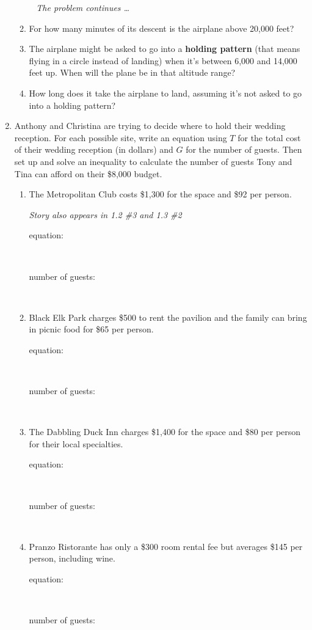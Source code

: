 \begin{enumerate}
\begin{enumerate}
\newpage %
~\hspace{-.5in} \emph{The problem continues \ldots}

\item For how many minutes of its descent is the airplane above 20,000 feet? \vfill
\item The airplane might be asked to go into a \textbf{holding pattern} (that means flying in a circle instead of landing) when it's between 6,000 and 14,000 feet up.  When will the plane be in that altitude range? \vfill
\item How long does it take the airplane to land, assuming it's not asked to go into a holding pattern? \vfill
\end{enumerate}

\newpage %

\item Anthony and Christina are trying to decide where to hold their wedding reception.  For each possible site, write an equation using $T$ for the total cost of their wedding reception (in dollars) and $G$ for the number of guests.  Then set up and solve an inequality to calculate the number of guests Tony and Tina can afford on their \$8,000 budget.  
\begin{enumerate}
\item The Metropolitan Club costs \$1,300 for the space and \$92 per person.
 
\hfill \emph{Story also appears in 1.2 \#3 and 1.3 \#2} \bigskip
\begin{description}
\item [equation:] ~\bigskip 
\item [number of guests:]  ~\vfill 
\end{description}  \bigskip
\item Black Elk Park charges  \$500 to rent the pavilion and the family can bring in picnic food for  \$65 per person.
\begin{description}
\item [equation:] ~\bigskip 
\item [number of guests:]  ~\vfill 
\end{description}  \bigskip
\item The Dabbling Duck Inn charges  \$1,400 for the space and \$80 per person for their local specialties. 
\begin{description}
\item [equation:] ~\bigskip 
\item [number of guests:]  ~\vfill 
\end{description}  \bigskip
\item Pranzo Ristorante has only a \$300 room rental fee but averages \$145 per person, including wine.
\begin{description}
\item [equation:] ~\bigskip 
\item [number of guests:]  ~\vfill 
\end{description}  \bigskip
\end{enumerate}


\end{enumerate}
